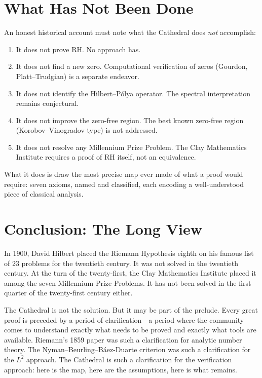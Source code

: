 \documentclass[11pt,a4paper]{article}
\begin{document}
\section{What Has Not Been Done}

An honest historical account must note what the Cathedral does
\emph{not} accomplish:

\begin{enumerate}
  \item It does not prove RH. No approach has.
  \item It does not find a new zero. Computational verification
    of zeros (Gourdon, Platt--Trudgian) is a separate endeavor.
  \item It does not identify the Hilbert--P\'olya operator. The
    spectral interpretation remains conjectural.
  \item It does not improve the zero-free region. The best known
    zero-free region (Korobov--Vinogradov type) is not addressed.
  \item It does not resolve any Millennium Prize Problem. The
    Clay Mathematics Institute requires a proof of RH itself,
    not an equivalence.
\end{enumerate}

What it does is draw the most precise map ever made of what a
proof would require: seven axioms, named and classified, each
encoding a well-understood piece of classical analysis.

\section{Conclusion: The Long View}

In 1900, David Hilbert placed the Riemann Hypothesis eighth on
his famous list of 23 problems for the twentieth century. It
was not solved in the twentieth century. At the turn of the
twenty-first, the Clay Mathematics Institute placed it among the
seven Millennium Prize Problems. It has not been solved in the
first quarter of the twenty-first century either.

The Cathedral is not the solution. But it may be part of the
prelude. Every great proof is preceded by a period of
clarification---a period where the community comes to understand
exactly what needs to be proved and exactly what tools are
available. Riemann's 1859 paper was such a clarification for
analytic number theory. The Nyman--Beurling--B\'aez-Duarte
criterion was such a clarification for the $L^2$ approach. The
Cathedral is such a clarification for the verification approach:
here is the map, here are the assumptions, here is what remains.
\end{document}
